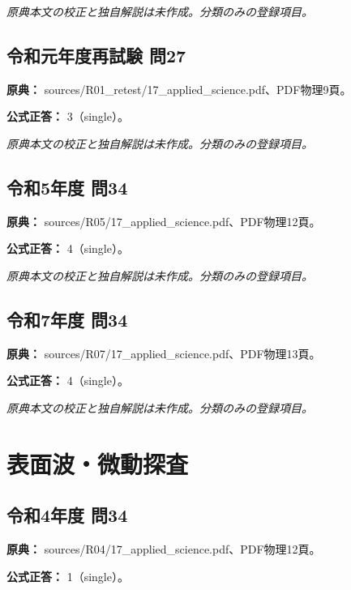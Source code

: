 \par\textit{原典本文の校正と独自解説は未作成。分類のみの登録項目。}

\subsection{令和元年度再試験 問27}
\label{q:r01-ret-applied-27}

\noindent\textbf{原典：} sources/R01\_retest/17\_applied\_science.pdf、PDF物理9頁。

\textbf{公式正答：} 3（single）。

\par\textit{原典本文の校正と独自解説は未作成。分類のみの登録項目。}

\subsection{令和5年度 問34}
\label{q:r05-reg-applied-34}

\noindent\textbf{原典：} sources/R05/17\_applied\_science.pdf、PDF物理12頁。

\textbf{公式正答：} 4（single）。

\par\textit{原典本文の校正と独自解説は未作成。分類のみの登録項目。}

\subsection{令和7年度 問34}
\label{q:r07-reg-applied-34}

\noindent\textbf{原典：} sources/R07/17\_applied\_science.pdf、PDF物理13頁。

\textbf{公式正答：} 4（single）。

\par\textit{原典本文の校正と独自解説は未作成。分類のみの登録項目。}

\section{表面波・微動探査}

\subsection{令和4年度 問34}
\label{q:r04-reg-applied-34}

\noindent\textbf{原典：} sources/R04/17\_applied\_science.pdf、PDF物理12頁。

\textbf{公式正答：} 1（single）。

